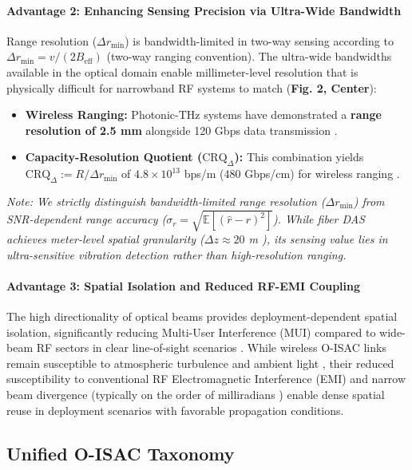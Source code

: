 \paragraph{Advantage 2: Enhancing Sensing Precision via Ultra-Wide Bandwidth}
Range resolution ($\Delta r_{\min}$) is bandwidth-limited in two-way sensing according to $\Delta r_{\min} = v/(2B_{\text{eff}})$ (two-way ranging convention). The ultra-wide bandwidths available in the optical domain enable millimeter-level resolution that is physically difficult for narrowband RF systems to match (\textbf{Fig. 2, Center}):
\begin{itemize}
    \item \textbf{Wireless Ranging:} Photonic-THz systems have demonstrated a \textbf{range resolution of 2.5 mm} alongside 120 Gbps data transmission \cite{O_ISAC_105}.
    \item \textbf{Capacity-Resolution Quotient ($\text{CRQ}_{\Delta}$):} This combination yields $\text{CRQ}_{\Delta} := R / \Delta r_{\min}$ of $4.8\times10^{13}$ bps/m (480 Gbps/cm) for wireless ranging \cite{O_ISAC_105}.
\end{itemize}
\textit{Note: We strictly distinguish bandwidth-limited range resolution ($\Delta r_{\min}$) from SNR-dependent range accuracy ($\sigma_r = \sqrt{\mathbb{E}[(\hat r - r)^2]}$). While fiber DAS achieves meter-level spatial granularity ($\Delta z \approx 20$ m \cite{O_ISAC_046}), its sensing value lies in ultra-sensitive vibration detection rather than high-resolution ranging.}

\paragraph{Advantage 3: Spatial Isolation and Reduced RF-EMI Coupling}
The high directionality of optical beams provides deployment-dependent spatial isolation, significantly reducing Multi-User Interference (MUI) compared to wide-beam RF sectors in clear line-of-sight scenarios \cite{O_ISAC_021}. While wireless O-ISAC links remain susceptible to atmospheric turbulence and ambient light \cite{O_ISAC_003}, their reduced susceptibility to conventional RF Electromagnetic Interference (EMI) and narrow beam divergence (typically on the order of milliradians \cite{O_ISAC_021}) enable dense spatial reuse in deployment scenarios with favorable propagation conditions.

\subsection{Unified O-ISAC Taxonomy}

